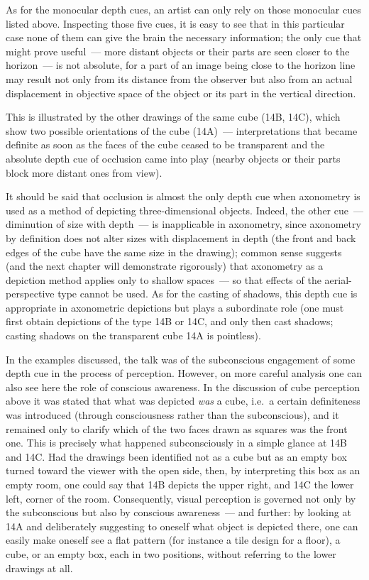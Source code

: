 
As for the monocular depth cues, an artist can only rely on those monocular cues listed
above.  Inspecting those five cues, it is easy to see that in this particular case none of
them can give the brain the necessary information; the only cue that might prove
useful~--- more distant objects or their parts are seen closer to the horizon~--- is not
absolute, for a part of an image being close to the horizon line may result not only from
its distance from the observer but also from an actual displacement in objective space of
the object or its part in the vertical direction.

This is illustrated by the other drawings of the same cube (14B, 14C), which show two
possible orientations of the cube (14A)~--- interpretations that became definite as soon
as the faces of the cube ceased to be transparent and the absolute depth cue of occlusion
came into play (nearby objects or their parts block more distant ones from view).

It should be said that occlusion is almost the only depth cue when axonometry is used as
a method of depicting three-dimensional objects.  Indeed, the other cue~--- diminution
of size with depth~--- is inapplicable in axonometry, since axonometry by definition
does not alter sizes with displacement in depth (the front and back edges of the cube
have the same size in the drawing); common sense suggests (and the next chapter will
demonstrate rigorously) that axonometry as a depiction method applies only to shallow
spaces~--- so that effects of the aerial-perspective type cannot be used.  As for the
casting of shadows, this depth cue is appropriate in axonometric depictions but plays a
subordinate role (one must first obtain depictions of the type 14B or 14C, and only then
cast shadows; casting shadows on the transparent cube 14A is pointless).

In the examples discussed, the talk was of the subconscious engagement of some depth
cue in the process of perception.  However, on more careful analysis one can also see
here the role of conscious awareness.  In the discussion of cube perception above it was
stated that what was depicted \emph{was} a cube, i.e.\ a certain definiteness was
introduced (through consciousness rather than the subconscious), and it remained only
to clarify which of the two faces drawn as squares was the front one.  This is precisely
what happened subconsciously in a simple glance at 14B and 14C\@.  Had the drawings
been identified not as a cube but as an empty box turned toward the viewer with the
open side, then, by interpreting this box as an empty room, one could say that 14B
depicts the upper right, and 14C the lower left, corner of the room.  Consequently,
visual perception is governed not only by the subconscious but also by conscious
awareness~--- and further: by looking at 14A and deliberately suggesting to oneself
what object is depicted there, one can easily make oneself see a flat pattern (for
instance a tile design for a floor), a cube, or an empty box, each in two positions,
without referring to the lower drawings at all.

